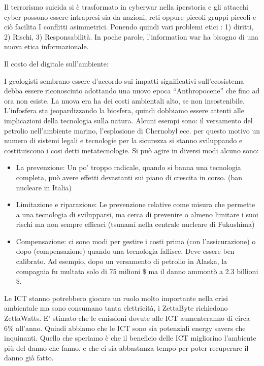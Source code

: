 \documentclass[a4page, 11pt]{article}
\begin{document}
Il terrorismo suicida si è trasformato in cyberwar nella iperstoria e
gli attacchi cyber possono essere intrapresi sia da nazioni, reti oppure
piccoli gruppi piccoli e ciò facilita I conflitti asimmetrici. Ponendo
quindi vari problemi etici : 1) diritti, 2) Rischi, 3) Responsabilità.
In poche parole, l'information war ha bisogno di una nuova etica
informazionale.

Il costo del digitale sull'ambiente:

I geologisti sembrano essere d'accordo sui impatti significativi
sull'ecosistema debba essere riconosciuto adottando una nuovo epoca
``Anthropocene'' che fino ad ora non esiste. La nuova era ha dei costi
ambientali alto, se non insostenibile. L'infosfera sta jeopardizzando la
biosfera, quindi dobbiamo essere attenti alle implicazioni della
tecnologia sulla natura. Alcuni esempi sono: il versamento del petrolio
nell'ambiente marino, l'esplosione di Chernobyl ecc. per questo motivo
un numero di sistemi legali e tecnologie per la sicurezza si stanno
sviluppando e costituiscono i cosi detti metatecnologie. Si può agire in
diversi modi alcuno sono:

\begin{itemize}
	 
	\item
	La prevenzione: Un po' troppo radicale, quando si banna una tecnologia
	completa, può avere effetti devastanti sui piano di crescita in corso.
	(ban nucleare in Italia)
	\item
	Limitazione e riparazione: Le prevenzione relative come misura che
	permette a una tecnologia di svilupparsi, ma cerca di prevenire o
	almeno limitare i suoi rischi ma non sempre efficaci (tsunami nella
	centrale nucleare di Fukushima)
	\item
	Compensazione: ci sono modi per gestire i costi prima (con
	l'assicurazione) o dopo (compensazione) quando una tecnologia
	fallisce. Deve essere ben calibrato. Ad esempio, dopo un versamento di
	petrolio in Alaska, la compagnia fu multata solo di 75 milioni \$ ma
	il danno ammontò a 2.3 billioni \$.
\end{itemize}

Le ICT stanno potrebbero giocare un ruolo molto importante nella crisi
ambientale ma sono consumano tanta elettricità, i ZettaByte richiedono
ZettaWatts. E' stimato che le emissioni dovute alle ICT aumenteranno di
circa 6\% all'anno. Quindi abbiamo che le ICT sono sia potenziali energy
savers che inquinanti. Quello che speriamo è che il beneficio delle ICT
migliorino l'ambiente più del danno che fanno, e che ci sia abbastanza
tempo per poter recuperare il danno già fatto.
\end{document}
